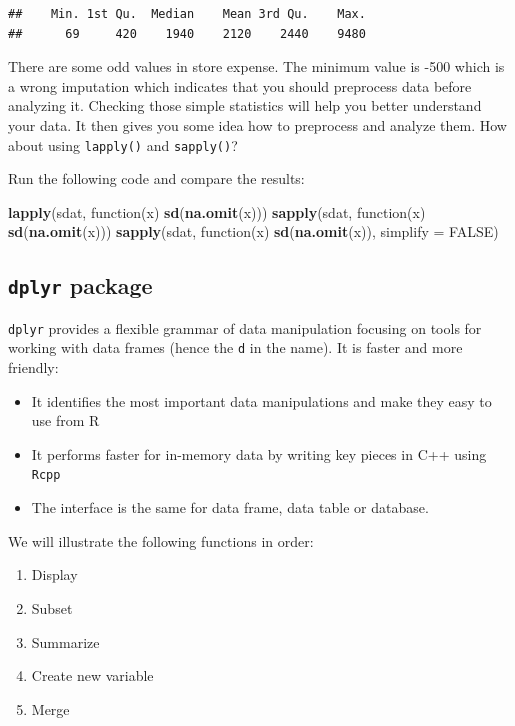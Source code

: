 \documentclass[12pt,]{krantz}
\newenvironment{Shaded}{\begin{snugshade}}{\end{snugshade}}
\newcommand{\KeywordTok}[1]{\textcolor[rgb]{0.13,0.29,0.53}{\textbf{{#1}}}}
\newcommand{\DataTypeTok}[1]{\textcolor[rgb]{0.13,0.29,0.53}{{#1}}}
\newcommand{\OtherTok}[1]{\textcolor[rgb]{0.56,0.35,0.01}{{#1}}}
\newcommand{\NormalTok}[1]{{#1}}
\providecommand{\tightlist}{%
  \setlength{\itemsep}{0pt}\setlength{\parskip}{0pt}}
\theoremstyle{definition}
\theoremstyle{definition}
\theoremstyle{remark}
\begin{document}
\begin{verbatim}
##    Min. 1st Qu.  Median    Mean 3rd Qu.    Max. 
##      69     420    1940    2120    2440    9480
\end{verbatim}

There are some odd values in store expense. The minimum value is -500
which is a wrong imputation which indicates that you should preprocess
data before analyzing it. Checking those simple statistics will help you
better understand your data. It then gives you some idea how to
preprocess and analyze them. How about using \texttt{lapply()} and
\texttt{sapply()}?

Run the following code and compare the results:

\begin{Shaded}
\begin{Highlighting}[]
\KeywordTok{lapply}\NormalTok{(sdat, function(x) }\KeywordTok{sd}\NormalTok{(}\KeywordTok{na.omit}\NormalTok{(x)))}
\KeywordTok{sapply}\NormalTok{(sdat, function(x) }\KeywordTok{sd}\NormalTok{(}\KeywordTok{na.omit}\NormalTok{(x)))}
\KeywordTok{sapply}\NormalTok{(sdat, function(x) }\KeywordTok{sd}\NormalTok{(}\KeywordTok{na.omit}\NormalTok{(x)), }\DataTypeTok{simplify =} \OtherTok{FALSE}\NormalTok{)}
\end{Highlighting}
\end{Shaded}

\subsection{\texorpdfstring{\texttt{dplyr}
package}{dplyr package}}\label{dplyr-package}

\texttt{dplyr} provides a flexible grammar of data manipulation focusing
on tools for working with data frames (hence the \texttt{d} in the
name). It is faster and more friendly:

\begin{itemize}
\tightlist
\item
  It identifies the most important data manipulations and make they easy
  to use from R
\item
  It performs faster for in-memory data by writing key pieces in C++
  using \texttt{Rcpp}
\item
  The interface is the same for data frame, data table or database.
\end{itemize}

We will illustrate the following functions in order:

\begin{enumerate}
\def\labelenumi{\arabic{enumi}.}
\tightlist
\item
  Display
\item
  Subset
\item
  Summarize
\item
  Create new variable
\item
  Merge
\end{enumerate}
\end{document}
